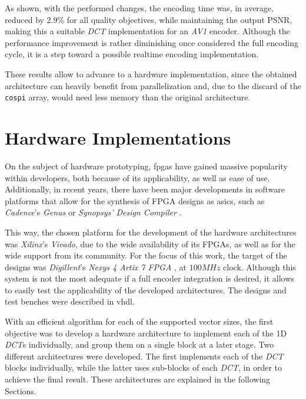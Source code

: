 As shown, with the performed changes, the encoding time was, in average, reduced by $2.9\%$ for all quality objectives, while maintaining the output PSNR, making this a suitable \emph{DCT} implementation for an \emph{AV1} encoder. Although the performance improvement is rather diminishing once considered the full encoding cycle, it is a step toward a possible realtime encoding implementation.

These results allow to advance to a hardware implementation, since the obtained architecture can heavily benefit from parallelization and, due to the discard of the \texttt{cospi} array, would need less memory than the original architecture.

\section{Hardware Implementations}

On the subject of hardware prototyping, \glspl{fpga} have gained massive popularity within developers, both because of its applicability, as well as ease of use. Additionally, in recent years, there have been major developments in software platforms that allow for the synthesis of FPGA designs as \glspl{asic}, such as \emph{Cadence}'s \emph{Genus} or \emph{Synopsys' Design Compiler} \cite{GenusSynthesisSolution, DesignCompilerGraphical}. 

This way, the chosen platform for the development of the hardware architectures was \emph{Xilinx}'s \emph{Vivado}, due to the wide availability of its FPGAs, as well as for the wide support from its community. For the focus of this work, the target of the designs was \emph{Digillent}'s \emph{Nexys 4 Artix 7 FPGA} \cite{NexysArtix7FPGA}, at $100MHz$ clock. Although this system is not the most adequate if a full encoder integration is desired, it allows to easily test the applicability of the developed architectures. The designs and test benches were described in \gls{vhdl}.

With an efficient algorithm for each of the supported vector sizes, the first objective was to develop a hardware architecture to implement each of the 1D \emph{DCT}s individually, and group them on a single block at a later stage. Two different architectures were developed. The first implements each of the \emph{DCT} blocks individually, while the latter uses sub-blocks of each \emph{DCT}, in order to achieve the final result. These architectures are explained in the following Sections.

